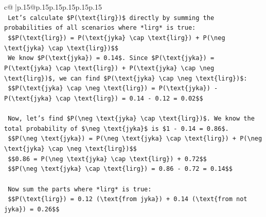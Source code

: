 \documentclass{article}
\begin{document}
{\begin{supertabular}{c@{$\;$}|p{.15\linewidth}@{}p{.15\linewidth}p{.15\linewidth}p{.15\linewidth}p{.15\linewidth}p{.15\linewidth}}
{{{\\ 
\texttt{    Let's calculate \$P(\textbackslash{}text\{lirg\})\$ directly by summing the probabilities of all scenarios where *lirg* is true:} \\
\texttt{    \$\$P(\textbackslash{}text\{lirg\}) = P(\textbackslash{}text\{jyka\} \textbackslash{}cap \textbackslash{}text\{lirg\}) + P(\textbackslash{}neg \textbackslash{}text\{jyka\} \textbackslash{}cap \textbackslash{}text\{lirg\})\$\$} \\
\texttt{    We know \$P(\textbackslash{}text\{jyka\}) = 0.14\$. Since \$P(\textbackslash{}text\{jyka\}) = P(\textbackslash{}text\{jyka\} \textbackslash{}cap \textbackslash{}text\{lirg\}) + P(\textbackslash{}text\{jyka\} \textbackslash{}cap \textbackslash{}neg \textbackslash{}text\{lirg\})\$, we can find \$P(\textbackslash{}text\{jyka\} \textbackslash{}cap \textbackslash{}neg \textbackslash{}text\{lirg\})\$:} \\
\texttt{    \$\$P(\textbackslash{}text\{jyka\} \textbackslash{}cap \textbackslash{}neg \textbackslash{}text\{lirg\}) = P(\textbackslash{}text\{jyka\}) {-} P(\textbackslash{}text\{jyka\} \textbackslash{}cap \textbackslash{}text\{lirg\}) = 0.14 {-} 0.12 = 0.02\$\$} \\
\\ 
\texttt{    Now, let's find \$P(\textbackslash{}neg \textbackslash{}text\{jyka\} \textbackslash{}cap \textbackslash{}text\{lirg\})\$. We know the total probability of \$\textbackslash{}neg \textbackslash{}text\{jyka\}\$ is \$1 {-} 0.14 = 0.86\$.} \\
\texttt{    \$\$P(\textbackslash{}neg \textbackslash{}text\{jyka\}) = P(\textbackslash{}neg \textbackslash{}text\{jyka\} \textbackslash{}cap \textbackslash{}text\{lirg\}) + P(\textbackslash{}neg \textbackslash{}text\{jyka\} \textbackslash{}cap \textbackslash{}neg \textbackslash{}text\{lirg\})\$\$} \\
\texttt{    \$\$0.86 = P(\textbackslash{}neg \textbackslash{}text\{jyka\} \textbackslash{}cap \textbackslash{}text\{lirg\}) + 0.72\$\$} \\
\texttt{    \$\$P(\textbackslash{}neg \textbackslash{}text\{jyka\} \textbackslash{}cap \textbackslash{}text\{lirg\}) = 0.86 {-} 0.72 = 0.14\$\$} \\
\\ 
\texttt{    Now sum the parts where *lirg* is true:} \\
\texttt{    \$\$P(\textbackslash{}text\{lirg\}) = 0.12 (\textbackslash{}text\{from jyka\}) + 0.14 (\textbackslash{}text\{from not jyka\}) = 0.26\$\$} \\
}}}
\end{supertabular}}
\end{document}
